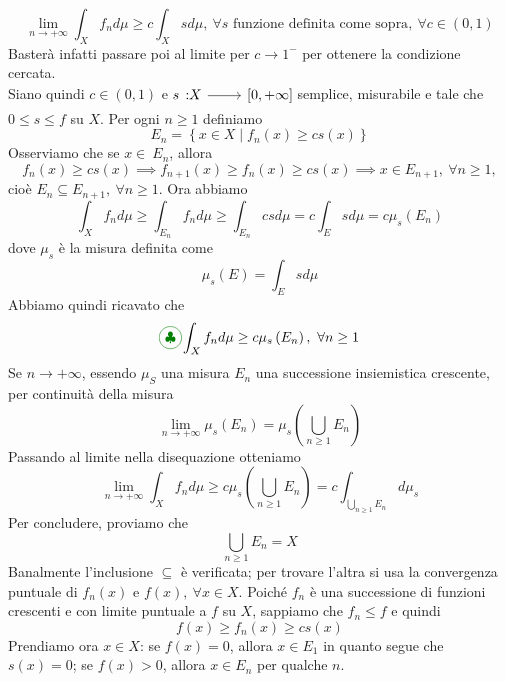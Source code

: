 \begin{demonstrationcaputwt}
\begin{enumerate}[label=\Roman*]
\begin{equation*}
	\lim_{n\to+\infty}\int_Xf_nd\mu\geq c\int_Xsd\mu,\ \forall s\text{ funzione definita come sopra},\ \forall c\in\left(0,1\right)
\end{equation*}
Basterà infatti passare poi al limite per $c\to 1^{-}$ per ottenere la condizione cercata.\\
Siano quindi $c\in\left(0,1\right)$ e $\funz{s}{X}{\left[0,+\infty\right]}$ semplice, misurabile e tale che $0\leq s\leq f$ su $X$. Per ogni $n\geq 1$ definiamo
\begin{equation*}
	E_n=\left\{x\in X\mid f_n(x)\geq cs(x)\right\}
\end{equation*}
Osserviamo che se $x\in\ E_n$, allora
\begin{equation*}
	f_n(x)\geq cs(x)\implies f_{n+1}(x)\geq f_n(x)\geq cs(x)\implies x\in E_{n+1},\ \forall n\geq 1,
\end{equation*}
cioè $E_n\subseteq E_{n+1},\ \forall n\geq 1$.
Ora abbiamo
\begin{equation*}
	\int_Xf_nd\mu\geq \int_{E_n}f_nd\mu\geq \int_{E_n}csd\mu=c\int_Esd\mu=c\mu_s\left(E_n\right)
\end{equation*}
dove $\mu_s$ è la misura definita come 
\begin{equation*}
	\mu_s\left(E\right)=\int_Esd\mu
\end{equation*}
Abbiamo quindi ricavato che
\begin{equation*}
	\circled[green]{\clubsuit}\int_Xf_nd\mu\geq c\mu_s\left(E_n\right),\ \forall n\geq 1
\end{equation*}
Se $n\to+\infty$, essendo $\mu_S$ una misura $E_n$ una successione insiemistica crescente, per continuità della misura
\begin{equation*}
	\lim_{n\to+\infty}\mu_s\left(E_n\right)=\mu_s\left(\bigcup_{n\geq 1}E_n\right)
\end{equation*}
Passando al limite nella disequazione \circled[green]{\clubsuit} otteniamo
\begin{equation*}
	\lim_{n\to+\infty}\int_Xf_nd\mu\geq c\mu_s\left(\bigcup_{n\geq 1}E_n\right)=c\int_{\bigcup_{n\geq 1}E_n}d\mu_s
\end{equation*}
Per concludere, proviamo che
\begin{equation*}
	\bigcup_{n\geq 1}E_n=X
\end{equation*}
Banalmente l'inclusione $\subseteq$ è verificata; per trovare l'altra si usa la convergenza puntuale di $f_n(x)$ e $f(x),\ \forall x\in X$. Poiché $f_n$ è una successione di funzioni crescenti e con limite puntuale a $f$ su $X$, sappiamo che $f_n\leq f$ e quindi
\begin{equation*}
	f(x)\geq f_n(x)\geq cs(x)
\end{equation*}
Prendiamo ora $x\in X$: se $f(x)=0$, allora $x\in E_1$ in quanto segue che $s(x)=0$; se $f(x)>0$, allora $x\in E_n$ per qualche $n$.
\qedhere
\end{enumerate}
\end{demonstrationcaputwt}
